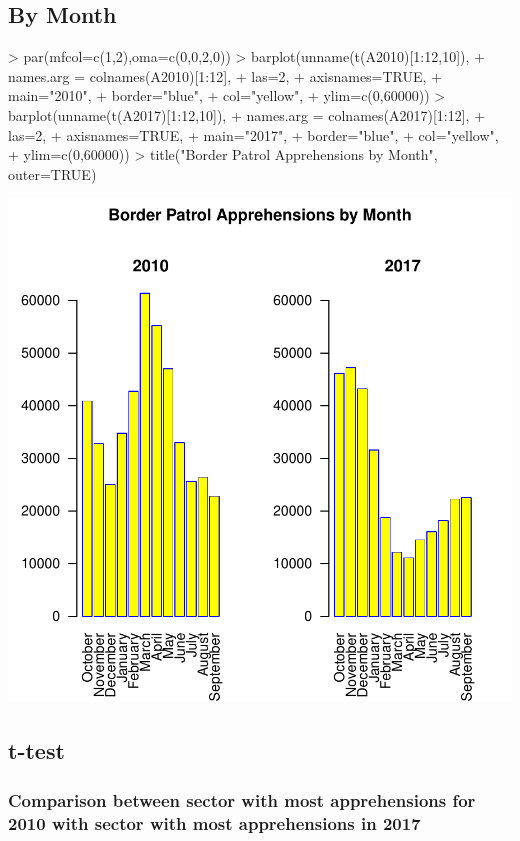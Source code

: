 \documentclass[letterpaper]{article}
\begin{document}
\subsection{By Month}
\begin{Schunk}
\begin{Sinput}
> par(mfcol=c(1,2),oma=c(0,0,2,0))
> barplot(unname(t(A2010)[1:12,10]), 
+         names.arg = colnames(A2010)[1:12], 
+         las=2,
+         axisnames=TRUE,
+         main="2010",
+         border="blue",
+         col="yellow",
+         ylim=c(0,60000))
> barplot(unname(t(A2017)[1:12,10]), 
+         names.arg = colnames(A2017)[1:12], 
+         las=2,
+         axisnames=TRUE,
+         main="2017",
+         border="blue",
+         col="yellow",
+         ylim=c(0,60000))
> title("Border Patrol Apprehensions by Month", outer=TRUE)
\end{Sinput}
\end{Schunk}
\includegraphics{Document-005}

\subsection{t-test}

\subsubsection{Comparison between sector with most apprehensions for 2010 with sector with most apprehensions in 2017}
\end{document}
